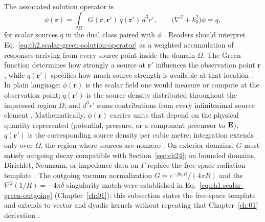 The associated solution operator is
\begin{equation}
\label{eq:ch2.scalar-green-solution-operator}
\phi(\mathbf{r})
=
\int_{\Omega} G(\mathbf{r},\mathbf{r}')\,q(\mathbf{r}')\,d^{3}r',
\qquad
\big(\nabla^{2}+k_0^{2}\big)\phi=q,
\end{equation}
for scalar sources \(q\) in the dual class paired with \(\phi\)
\cite{stratton1941}.
Readers should interpret Eq.~\eqref{eq:ch2.scalar-green-solution-operator} as a weighted
accumulation of responses arriving from every source point inside the domain $\Omega$.
The Green function determines how strongly a source at $\mathbf{r}'$ influences the
observation point $\mathbf{r}$, while $q(\mathbf{r}')$ specifies how much source strength is
available at that location \cite{stratton1941}. In plain language: $\phi(\mathbf{r})$ is the
scalar field one would measure or compute at the observation point; $q(\mathbf{r}')$ is the
source density distributed throughout the impressed region $\Omega$; and $d^{3}r'$ sums
contributions from every infinitesimal source element \cite{jackson1999}. Mathematically,
$\phi(\mathbf{r})$ carries units that depend on the physical quantity represented (potential,
pressure, or a component precursor to $\mathbf{E}$); $q(\mathbf{r}')$ is the corresponding source
density per cubic metre; integration extends only over $\Omega$, the region where sources are
nonzero \cite{stratton1941}.
On exterior domains, $G$ must satisfy outgoing decay compatible
with Section~\ref{sec:ch24}; on bounded domains, Dirichlet, Neumann, or impedance
data on \(\Gamma\) replace the free-space radiation template
\cite{harrington2001}.
The outgoing vacuum normalization $G=e^{-\jj k_0 R}/(4\pi R)$ and the $\nabla^2(1/R)=-4\pi\delta$ singularity match were established in Eq.~\eqref{eq:ch1.scalar-green-outgoing} (Chapter~\ref{ch:01}); this subsection states the free-space template and extends to vector and dyadic kernels without repeating that Chapter~\ref{ch:01} derivation \cite{stratton1941,jackson1999}.

